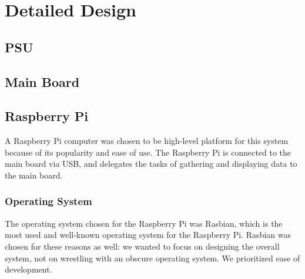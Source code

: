 \chapter{Detailed Design}




\section{PSU}

\section{Main Board}

\section{Raspberry Pi}

A Raspberry Pi computer was chosen to be high-level platform for this system
because of its popularity and ease of use. The Raspberry Pi is connected to the
main board via USB, and delegates the tasks of gathering and displaying data
to the main board.

\subsection{Operating System}
The operating system chosen for the Raspberry Pi was Rasbian, which is the
most used and well-known operating system for the Raspberry Pi. Rasbian was
chosen for these reasons as well: we wanted to focus on designing the overall
system, not on wrestling with an obscure operating system. We prioritized ease
of development.


